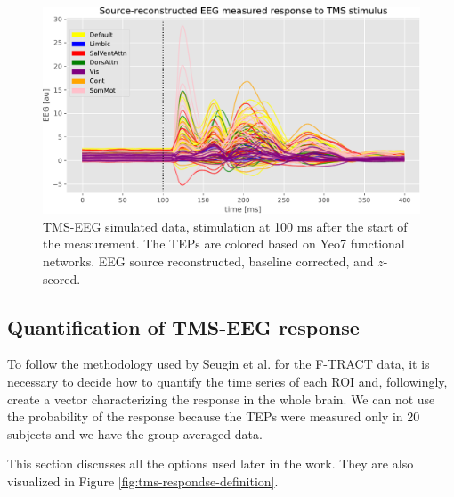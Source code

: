 \begin{figure}
    \centering
    \includegraphics[width=\textwidth]{images/nootebook_generated/tmseeg_results/simulated/200/not_over_threshold_nan/data.pdf}
    \caption[TMS-EEG simulated data]{TMS-EEG simulated data, stimulation at 100 ms after the start of the measurement. The TEPs are colored based on Yeo7 functional networks. EEG source reconstructed, baseline corrected, and $z$-scored.}
    \label{fig:tms-simulated-data}
\end{figure}

\subsection{Quantification of TMS-EEG response}

To follow the methodology used by Seugin et al. for the F-TRACT data, it is necessary to decide how to quantify the time series of each ROI and, followingly, create a vector characterizing the response in the whole brain. We can not use the probability of the response because the TEPs were measured only in 20 subjects and we have the group-averaged data.

This section discusses all the options used later in the work. They are also visualized in Figure \ref{fig:tms-respondse-definition}.

